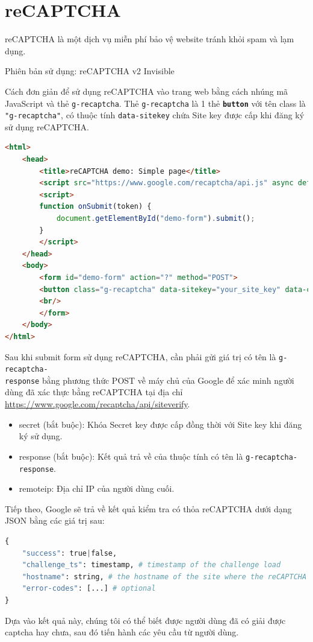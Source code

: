 \section{reCAPTCHA}
reCAPTCHA là một dịch vụ miễn phí bảo vệ website tránh khỏi spam và lạm dụng\cite{captcha}.
\par
Phiên bản sử dụng: reCAPTCHA v2 Invisible
\par
Cách đơn giản để sử dụng reCAPTCHA vào trang web bằng cách nhúng mã JavaScript và thẻ \texttt{g-recaptcha}. Thẻ \texttt{g-recaptcha} là 1 thẻ \textbf{\texttt{button}} với tên class là \texttt{"g-recaptcha"}, có thuộc tính \texttt{data-sitekey} chứa Site key được cấp khi đăng ký sử dụng reCAPTCHA.
\begin{lstlisting}[language=HTML]
<html>
  	<head>
    	<title>reCAPTCHA demo: Simple page</title>
     	<script src="https://www.google.com/recaptcha/api.js" async defer></script>
     	<script>
       	function onSubmit(token) {
         	document.getElementById("demo-form").submit();
       	}
     	</script>
  	</head>
  	<body>
    	<form id="demo-form" action="?" method="POST">
      	<button class="g-recaptcha" data-sitekey="your_site_key" data-callback="onSubmit">Submit</button>
      	<br/>
    	</form>
  	</body>
</html>
\end{lstlisting}
\par
Sau khi submit form sử dụng reCAPTCHA, cần phải gửi giá trị có tên là \texttt{g-recaptcha-\\response} bằng phương thức POST về máy chủ của Google để xác minh người dùng đã xác thực bằng reCAPTCHA tại địa chỉ \url{https://www.google.com/recaptcha/api/siteverify}.
\begin{itemize}
	\item secret (bắt buộc): Khóa Secret key được cấp đồng thời với Site key khi đăng ký sử dụng.
	\item response (bắt buộc): Kết quả trả về của thuộc tính có tên là \texttt{g-recaptcha-response}.
	\item remoteip: Địa chỉ IP của người dùng cuối.
\end{itemize}
\par
Tiếp theo, Google sẽ trả về kết quả kiểm tra có thỏa reCAPTCHA dưới dạng JSON bằng các giá trị sau:
\begin{lstlisting}[language=Python]
{
	"success": true|false,
	"challenge_ts": timestamp, # timestamp of the challenge load
	"hostname": string, # the hostname of the site where the reCAPTCHA was solved
	"error-codes": [...] # optional
}
\end{lstlisting}
\par
Dựa vào kết quả này, chúng tôi có thể biết được người dùng đã có giải được captcha hay chưa, sau đó tiến hành các yêu cầu từ người dùng.	
